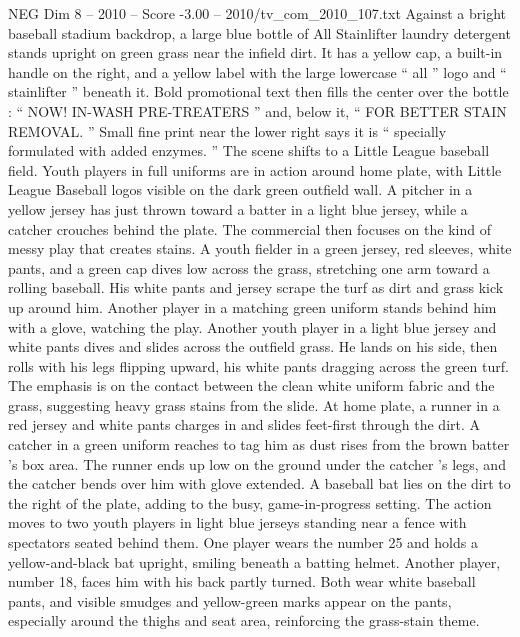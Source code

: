 \begin{textsample}{NEG Dim 8 – 2010 – Score -3.00 – 2010/tv\_com\_2010\_107.txt}  \label{ex:f8_neg_072}
Against a bright baseball stadium backdrop, a large blue bottle of All Stainlifter laundry detergent stands upright on green grass near the infield dirt.
It has a yellow cap, a built-in handle on the right, and a yellow label with the large lowercase “ all ” logo and “ stainlifter ” beneath it.
Bold promotional text then fills the center over the bottle : “ NOW!
IN-WASH PRE-TREATERS ” and, below it, “ FOR BETTER STAIN REMOVAL. ” Small fine print near the lower right says it is “ specially formulated with added enzymes. ” The scene shifts to a Little League baseball field.
Youth players in full uniforms are in action around home plate, with Little League Baseball logos visible on the dark green outfield wall.
A pitcher in a yellow jersey has just thrown toward a batter in a light blue jersey, while a catcher crouches behind the plate.
The commercial then focuses on the kind of messy play that creates stains.
A youth fielder in a green jersey, red sleeves, white pants, and a green cap dives low across the grass, stretching one arm toward a rolling baseball.
His white pants and jersey scrape the turf as dirt and grass kick up around him.
Another player in a matching green uniform stands behind him with a glove, watching the play.
Another youth player in a light blue jersey and white pants dives and slides across the outfield grass.
He lands on his side, then rolls with his legs flipping upward, his white pants dragging across the green turf.
The emphasis is on the contact between the clean white uniform fabric and the grass, suggesting heavy grass stains from the slide.
At home plate, a runner in a red jersey and white pants charges in and slides feet-first through the dirt.
A catcher in a green uniform reaches to tag him as dust rises from the brown batter ’s box area.
The runner ends up low on the ground under the catcher ’s legs, and the catcher bends over him with glove extended.
A baseball bat lies on the dirt to the right of the plate, adding to the busy, game-in-progress setting.
The action moves to two youth players in light blue jerseys standing near a fence with spectators seated behind them.
One player wears the number 25 and holds a yellow-and-black bat upright, smiling beneath a batting helmet.
Another player, number 18, faces him with his back partly turned.
Both wear white baseball pants, and visible smudges and yellow-green marks appear on the pants, especially around the thighs and seat area, reinforcing the grass-stain theme.

\end{textsample}
